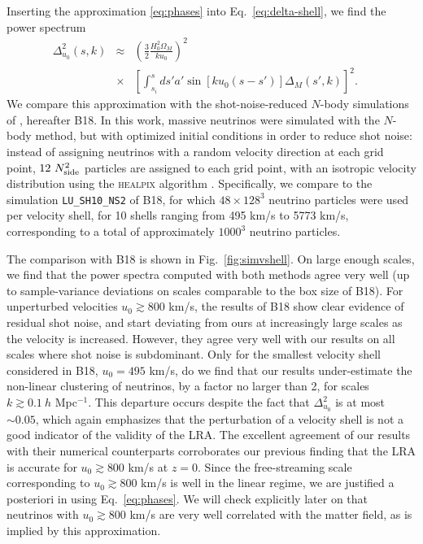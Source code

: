 \documentclass[useAMS, usenatbib]{mnras}
\newcommand{\barr}{\begin{eqnarray}}
\newcommand{\earr}{\end{eqnarray}}
\newcommand{\spb}[1]{{\textcolor{green}{[{\bf SPB}: #1]}}}
\begin{document}
Inserting the approximation \eqref{eq:phases} into Eq.~\eqref{eq:delta-shell}, we find the power spectrum
\barr
\Delta^2_{u_0}(s, k)&\approx& \left(\frac32 \frac{H_0^2 \Omega_M}{k u_0}\right)^2\nonumber\\
&\times& \left[\int_{s_i}^s ds' a' \sin[k u_0 (s - s')] \Delta_M(s', k) \right]^2. ~~~~~
\earr
We compare this approximation with the shot-noise-reduced $N$-body simulations of \cite{Banerjee_2018}, hereafter B18. In this work, massive neutrinos were simulated with the $N$-body method, but with optimized initial conditions in order to reduce shot noise: instead of assigning neutrinos with a random velocity direction at each grid point, $12 ~N_{\rm side}^2$ particles are assigned to each grid point, with an isotropic velocity distribution using the \textsc{healpix} algorithm \citep{Healpix}. Specifically, we compare to the simulation \texttt{LU\_SH10\_NS2} of B18, for which $48 \times 128^3$ neutrino particles were used per velocity shell, for 10 shells ranging from 495 km/s to 5773 km/s, corresponding to a total of approximately $1000^3$ neutrino particles.

The comparison with B18 is shown in Fig.~\ref{fig:simvshell}. On large enough scales, we find that the power spectra computed with both methods agree very well (up to sample-variance deviations on scales comparable to the box size of B18). For unperturbed velocities $u_0 \gtrsim 800$ km/s, the results of B18 show clear evidence of residual shot noise, and start deviating from ours at increasingly large scales as the velocity is increased. However, they agree very well with our results on all scales where shot noise is subdominant. Only for the smallest velocity shell considered in B18, $u_0 = 495$ km/s, do we find that our results under-estimate the non-linear clustering of neutrinos, by a factor no larger than 2, for scales $k \gtrsim 0.1~h$ Mpc$^{-1}$. This departure occurs despite the fact that $\Delta^2_{u_0}$ is at most $\sim 0.05$, which again emphasizes that the perturbation of a velocity shell is not a good indicator of the validity of the LRA.
The excellent agreement of our results with their numerical counterparts corroborates our previous finding that the LRA is accurate for $u_0 \gtrsim 800$ km/s at $z = 0$. Since the free-streaming scale corresponding to $u_0 \gtrsim 800$ km/s is well in the linear regime, we are justified a posteriori in using Eq.~\eqref{eq:phases}. We will check explicitly later on that neutrinos with $u_0 \gtrsim 800$ km/s are very well correlated with the matter field, as is implied by this approximation.
\end{document}

